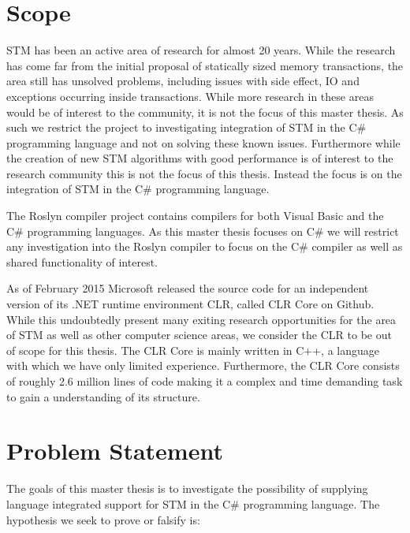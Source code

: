 \section{Scope}
\ac{STM} has been an active area of research for almost 20 years\cite{shavit1997software}. While the research has come far from the initial proposal of statically sized memory transactions, the area still has unsolved problems, including issues with side effect, \ac{IO} and exceptions occurring inside transactions\cite{harris2005exceptions}. While more research in these areas would be of interest to the community, it is not the focus of this master thesis. As such we restrict the project to investigating integration of \ac{STM} in the C\# programming language and not on solving these known issues. Furthermore while the creation of new \ac{STM} algorithms with good performance is of interest to the research community this is not the focus of this thesis. Instead  the focus is on the integration of \ac{STM} in the C\# programming language.

The Roslyn compiler project contains compilers for both Visual Basic and the C\# programming languages\cite{roslyn}. As this master thesis focuses on C\# we will restrict any investigation into the Roslyn compiler to focus on the C\# compiler as well as shared functionality of interest. 

As of February 2015 Microsoft released the source code for an independent version of its .NET runtime environment \acl{CLR}, called \ac{CLR} Core on Github\cite{coreclr}. While this undoubtedly present many exiting research opportunities for the area of \ac{STM} as well as other computer science areas, we consider the \ac{CLR} to be out of scope for this thesis. The \ac{CLR} Core is mainly written in C++\cite{coreclr}, a language with which we have only limited experience. Furthermore, the \ac{CLR} Core consists of roughly 2.6 million lines of code\cite{coreclrBlog} making it a complex and time demanding task to gain a understanding of its structure.

\section{Problem Statement}
The goals of this master thesis is to investigate the possibility of supplying language integrated support for \ac{STM} in the C\# programming language. The hypothesis we seek to prove or falsify is:

